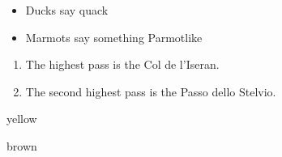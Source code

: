 \documentclass{book}
\begin{document}
\begin{itemize}
\item Ducks say quack
\item Marmots say something Parmotlike
\end{itemize}

\begin{enumerate}[item-label=(\alph{*})]
\item The highest pass is the Col de l'Iseran.
\item The second highest pass is the Passo dello Stelvio.
\end{enumerate}

\begin{description}[label-width=3cm,label-align=right]
\item[ducks] yellow
\item[marmots] brown
\end{description}
\end{document}
